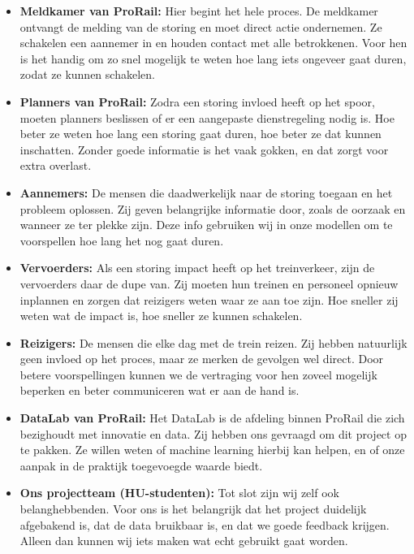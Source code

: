 \documentclass{article}
\begin{document}
\begin{itemize}
    \item \textbf{Meldkamer van ProRail:} Hier begint het hele proces. De meldkamer ontvangt de melding van de storing en moet direct actie ondernemen. Ze schakelen een aannemer in en houden contact met alle betrokkenen. Voor hen is het handig om zo snel mogelijk te weten hoe lang iets ongeveer gaat duren, zodat ze kunnen schakelen.

    \item \textbf{Planners van ProRail:} Zodra een storing invloed heeft op het spoor, moeten planners beslissen of er een aangepaste dienstregeling nodig is. Hoe beter ze weten hoe lang een storing gaat duren, hoe beter ze dat kunnen inschatten. Zonder goede informatie is het vaak gokken, en dat zorgt voor extra overlast.

    \item \textbf{Aannemers:} De mensen die daadwerkelijk naar de storing toegaan en het probleem oplossen. Zij geven belangrijke informatie door, zoals de oorzaak en wanneer ze ter plekke zijn. Deze info gebruiken wij in onze modellen om te voorspellen hoe lang het nog gaat duren.

    \item \textbf{Vervoerders:} Als een storing impact heeft op het treinverkeer, zijn de vervoerders daar de dupe van. Zij moeten hun treinen en personeel opnieuw inplannen en zorgen dat reizigers weten waar ze aan toe zijn. Hoe sneller zij weten wat de impact is, hoe sneller ze kunnen schakelen.

    \item \textbf{Reizigers:} De mensen die elke dag met de trein reizen. Zij hebben natuurlijk geen invloed op het proces, maar ze merken de gevolgen wel direct. Door betere voorspellingen kunnen we de vertraging voor hen zoveel mogelijk beperken en beter communiceren wat er aan de hand is.

    \item \textbf{DataLab van ProRail:} Het DataLab is de afdeling binnen ProRail die zich bezighoudt met innovatie en data. Zij hebben ons gevraagd om dit project op te pakken. Ze willen weten of machine learning hierbij kan helpen, en of onze aanpak in de praktijk toegevoegde waarde biedt.

    \item \textbf{Ons projectteam (HU-studenten):} Tot slot zijn wij zelf ook belanghebbenden. Voor ons is het belangrijk dat het project duidelijk afgebakend is, dat de data bruikbaar is, en dat we goede feedback krijgen. Alleen dan kunnen wij iets maken wat echt gebruikt gaat worden.
\end{itemize}
\end{document}

